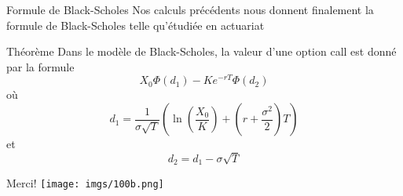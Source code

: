 \documentclass{beamer}
\newcommand{\1}{\mathmybb{1}}
\begin{document}
   \begin{frame}{Formule de Black-Scholes}
     Nos calculs précédents nous donnent finalement la formule de Black-Scholes telle qu'étudiée en actuariat
     \begin{block}{Théorème}
       Dans le modèle de Black-Scholes, la valeur d'une option call est donné par la formule
       \begin{equation}
         X_{0}\varPhi(d_{1}) - Ke^{-rT}\varPhi(d_{2})
       \end{equation}
       où
       \[
         d_{1} = \frac{1}{\sigma \sqrt{T}} \left( \ln \left(\frac{X_{0}}{K} \right) + \left( r + \frac{\sigma^{2}}{2} \right)T \right)
       \]
       et
       \[
         d_{2} = d_{1} - \sigma \sqrt{T}
       \]
    \end{block}
  \end{frame}
  \begin{frame}{Merci!}
    \texttt{[image: imgs/100b.png]}
  \end{frame}
\end{document}
